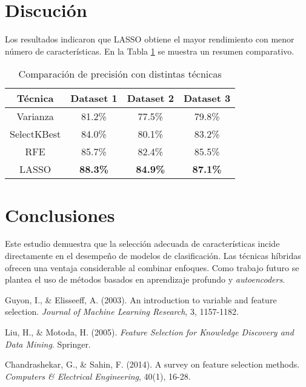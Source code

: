 \documentclass[twocolumn]{article}
\begin{document}
\section{Discución}
Los resultados indicaron que LASSO obtiene el mayor rendimiento con menor número de características. En la Tabla \ref{tab:resultados} se muestra un resumen comparativo.

\begin{table}[h]
\centering
\caption{Comparación de precisión con distintas técnicas}
\label{tab:resultados}
\begin{tabular}{|c|c|c|c|}
\hline
Técnica & Dataset 1 & Dataset 2 & Dataset 3 \\
\hline
Varianza & 81.2\% & 77.5\% & 79.8\% \\
SelectKBest & 84.0\% & 80.1\% & 83.2\% \\
RFE & 85.7\% & 82.4\% & 85.5\% \\
LASSO & \textbf{88.3\%} & \textbf{84.9\%} & \textbf{87.1\%} \\
\hline
\end{tabular}
\end{table}

\section{Conclusiones}
Este estudio demuestra que la selección adecuada de características incide directamente en el desempeño de modelos de clasificación. Las técnicas híbridas ofrecen una ventaja considerable al combinar enfoques. Como trabajo futuro se plantea el uso de métodos basados en aprendizaje profundo y \textit{autoencoders}.

\begin{thebibliography}{9}
Guyon, I., \& Elisseeff, A. (2003). An introduction to variable and feature selection. \textit{Journal of Machine Learning Research}, 3, 1157-1182.

Liu, H., \& Motoda, H. (2005). \textit{Feature Selection for Knowledge Discovery and Data Mining}. Springer.

Chandrashekar, G., \& Sahin, F. (2014). A survey on feature selection methods. \textit{Computers \& Electrical Engineering}, 40(1), 16-28.
\end{thebibliography}
\end{document}
